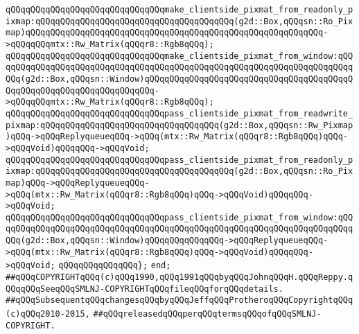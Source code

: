 \verb|qQQqqQQqqQQqqQQqqQQqqQQqqQQqqQQqmake_clientside_pixmat_from_readonly_pixmap:qQQqqQQqqQQqqQQqqQQqqQQqqQQqqQQqqQQqqQQq(g2d::Box,qQQqsn::Ro_Pixmap)qQQqqQQqqQQqqQQqqQQqqQQqqQQqqQQqqQQqqQQqqQQqqQQqqQQqqQQqqQQq->qQQqqQQqmtx::Rw_Matrix(qQQqr8::Rgb8qQQq);|\newline
\verb|qQQqqQQqqQQqqQQqqQQqqQQqqQQqqQQqmake_clientside_pixmat_from_window:qQQqqQQqqQQqqQQqqQQqqQQqqQQqqQQqqQQqqQQqqQQqqQQqqQQqqQQqqQQqqQQqqQQqqQQqqQQq(g2d::Box,qQQqsn::Window)qQQqqQQqqQQqqQQqqQQqqQQqqQQqqQQqqQQqqQQqqQQqqQQqqQQqqQQqqQQqqQQqqQQqqQQq->qQQqqQQqmtx::Rw_Matrix(qQQqr8::Rgb8qQQq);|\newline
\newline
\verb|qQQqqQQqqQQqqQQqqQQqqQQqqQQqqQQqpass_clientside_pixmat_from_readwrite_pixmap:qQQqqQQqqQQqqQQqqQQqqQQqqQQqqQQqqQQq(g2d::Box,qQQqsn::Rw_Pixmap)qQQq->qQQqReplyqueueqQQq->qQQq(mtx::Rw_Matrix(qQQqr8::Rgb8qQQq)qQQq->qQQqVoid)qQQqqQQq->qQQqVoid;|\newline
\verb|qQQqqQQqqQQqqQQqqQQqqQQqqQQqqQQqpass_clientside_pixmat_from_readonly_pixmap:qQQqqQQqqQQqqQQqqQQqqQQqqQQqqQQqqQQqqQQq(g2d::Box,qQQqsn::Ro_Pixmap)qQQq->qQQqReplyqueueqQQq->qQQq(mtx::Rw_Matrix(qQQqr8::Rgb8qQQq)qQQq->qQQqVoid)qQQqqQQq->qQQqVoid;|\newline
\verb|qQQqqQQqqQQqqQQqqQQqqQQqqQQqqQQqpass_clientside_pixmat_from_window:qQQqqQQqqQQqqQQqqQQqqQQqqQQqqQQqqQQqqQQqqQQqqQQqqQQqqQQqqQQqqQQqqQQqqQQqqQQq(g2d::Box,qQQqsn::Window)qQQqqQQqqQQqqQQq->qQQqReplyqueueqQQq->qQQq(mtx::Rw_Matrix(qQQqr8::Rgb8qQQq)qQQq->qQQqVoid)qQQqqQQq->qQQqVoid;|\newline
\verb|qQQqqQQqqQQqqQQq};|\newline
\newline
\verb|end;|\newline
\newline
\verb|##qQQqCOPYRIGHTqQQq(c)qQQq1990,qQQq1991qQQqbyqQQqJohnqQQqH.qQQqReppy.qQQqqQQqSeeqQQqSMLNJ-COPYRIGHTqQQqfileqQQqforqQQqdetails.|\newline
\verb|##qQQqSubsequentqQQqchangesqQQqbyqQQqJeffqQQqProtheroqQQqCopyrightqQQq(c)qQQq2010-2015,|\newline
\verb|##qQQqreleasedqQQqperqQQqtermsqQQqofqQQqSMLNJ-COPYRIGHT.|\newline

